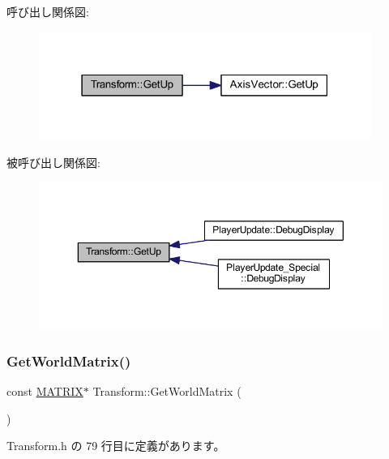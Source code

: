 呼び出し関係図\+:\nopagebreak
\begin{figure}[H]
\begin{center}
\leavevmode
\includegraphics[width=307pt]{class_transform_a9f5700481ae42556f763726947feaf36_cgraph}
\end{center}
\end{figure}
被呼び出し関係図\+:\nopagebreak
\begin{figure}[H]
\begin{center}
\leavevmode
\includegraphics[width=350pt]{class_transform_a9f5700481ae42556f763726947feaf36_icgraph}
\end{center}
\end{figure}
\mbox{\label{class_transform_a060f9487a18ad34549eab53a7ca5100d}} 
\subsubsection{\texorpdfstring{Get\+World\+Matrix()}{GetWorldMatrix()}}
{\footnotesize\ttfamily const \mbox{\hyperlink{_vector3_d_8h_a032295cd9fb1b711757c90667278e744}{M\+A\+T\+R\+IX}}$\ast$ Transform\+::\+Get\+World\+Matrix (\begin{DoxyParamCaption}{ }\end{DoxyParamCaption})\hspace{0.3cm}{\ttfamily [inline]}}



 Transform.\+h の 79 行目に定義があります。

